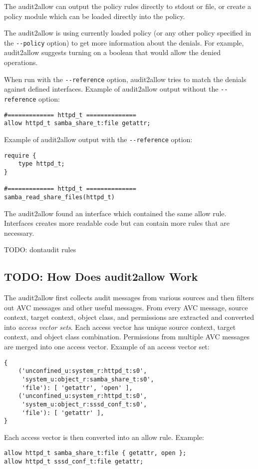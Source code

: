 The audit2allow can output the policy rules directly to stdout or file, or
create a policy module which can be loaded directly into the policy.

The audit2allow is using currently loaded policy (or any other policy specified
in the \texttt{-{}-policy} option) to get more information about the denials.
For example, audit2allow suggests turning on a boolean that would allow the
denied operations.

When run with the \texttt{-{}-reference} option, audit2allow tries to match the
denials against defined interfaces. Example of audit2allow output without the
\texttt{-{}-reference} option:
\begin{lstlisting}
#============= httpd_t ==============
allow httpd_t samba_share_t:file getattr;
\end{lstlisting}
Example of audit2allow output with the \texttt{-{}-reference} option:
\begin{lstlisting}
require {
	type httpd_t;
}

#============= httpd_t ==============
samba_read_share_files(httpd_t)
\end{lstlisting}
The audit2allow found an interface which contained the same allow
rule. Interfaces creates more readable code but can contain more rules that are
necessary.

TODO: dontaudit rules

\subsection{TODO: How Does audit2allow Work}
The audit2allow first collects audit messages from various sources and then
filters out AVC messages and other useful messages. From every AVC message,
source context, target context, object class, and permissions are extracted and
converted into \emph{access vector sets}. Each access vector has unique source
context, target context, and object class combination. Permissions from multiple
AVC messages are merged into one access vector. Example of an access vector set:
\begin{lstlisting}
{
    ('unconfined_u:system_r:httpd_t:s0',
     'system_u:object_r:samba_share_t:s0',
     'file'): [ 'getattr', 'open' ],
    ('unconfined_u:system_r:httpd_t:s0',
     'system_u:object_r:sssd_conf_t:s0',
     'file'): [ 'getattr' ],
}
\end{lstlisting}

Each access vector is then converted into an allow rule. Example:
\begin{lstlisting}
allow httpd_t samba_share_t:file { getattr, open };
allow httpd_t sssd_conf_t:file getattr;
\end{lstlisting}

